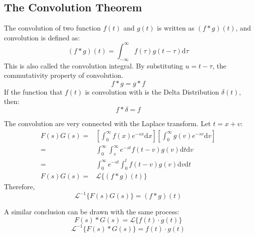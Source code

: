 \subsection{The Convolution Theorem}
The convolution of two function $f(t)$ and $g(t)$ is written as $(f*g)(t)$, and convolution is defined as: 
\begin{equation}
    (f*g)(t) = \int_{-\infty}^{\infty} f(\tau)g(t-\tau) \mathrm{d}\tau
\end{equation}
This is also called the convolution integral. 
By substituting $u=t-\tau$, the commutativity property of convolution. 
\begin{equation}
    f*g = g*f
\end{equation}
If the function that $f(t)$ is convolution with is the Delta Distribution $\delta(t)$, then: 
\begin{equation}
    f*\delta = f
\end{equation}

The convolution are very connected with the Laplace transform. Let $t=x+v$: 
\begin{align*}
    F(s)G(s) 
    =& \left[\int_{0}^{\infty} f(x)e^{-sx} \mathrm{d}x\right]\left[\int_{0}^{\infty} g(v)e^{-sv} \mathrm{d}v\right] \\
    =& \int_{0}^{\infty} \int_{v}^{\infty}e^{-st} f(t-v)g(v) \mathrm{d}t \mathrm{d}v \\
    =& \int_{0}^{\infty} e^{-st} \int_{0}^{t} f(t-v)g(v) \mathrm{d}v \mathrm{d}t \\
    F(s)G(s) 
    =& \mathcal{L}\{ (f*g)(t) \}
\end{align*}
Therefore, 
    $$\mathcal{L}^{-1}\{ F(s)G(s) \} = (f*g)(t) $$

A similar conclusion can be drawn with the same process: 
    $$F(s)*G(s) = \mathcal{L}\{ f(t) \cdot g(t) \}$$
    $$\mathcal{L}^{-1}\{ F(s)*G(s) \} = f(t) \cdot g(t)$$


